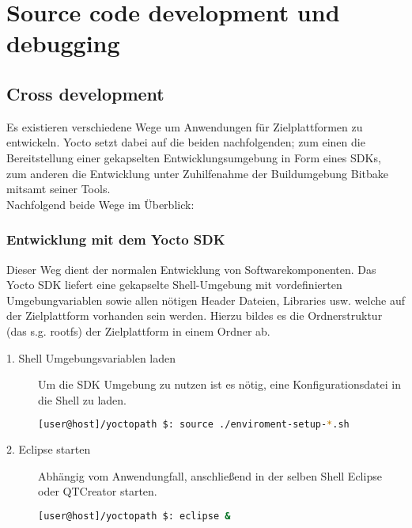 \chapter{Source code development und debugging}%
\label{cha:source_code_development}


\section{Cross development}%
\label{sec:cross_development}
Es existieren verschiedene Wege um Anwendungen für Ziel\-plattformen zu
entwickeln. Yocto setzt dabei auf die beiden nachfolgenden; zum einen die
Bereitstellung einer gekapselten Entwicklungsumgebung in Form eines \glspl{SDK},
zum anderen die Entwicklung unter Zuhilfenahme der Build\-umgebung Bitbake
mitsamt seiner Tools.  \\

Nachfolgend beide Wege im Überblick:

\subsection{Entwicklung mit dem Yocto SDK}%
\label{sub:entwicklung_mit_dem_yocto_sdk}
Dieser Weg dient der normalen Entwicklung von Software\-komponenten. Das Yocto
SDK liefert eine gekapselte Shell-Umgebung mit vordefinierten
Umgebung\-variablen sowie allen nötigen Header Dateien, Libraries usw. welche
auf der Ziel\-plattform vorhanden sein werden. Hierzu bildes es die
Ordner\-struktur (das s.g. \gls{rootfs}) der Ziel\-plattform in einem Ordner
ab. \\


\begin{description}
    \item[1. Shell Umgebungsvariablen laden] Um die SDK Umgebung zu nutzen ist
        es nötig, eine Konfigurationsdatei in die Shell zu laden.

\begin{lstlisting}[frame=single,language=bash,caption={Einrichten der SDK
        Umgebung}]
[user@host]/yoctopath $: source ./enviroment-setup-*.sh
\end{lstlisting}


    \item[2. Eclipse starten] Abhängig vom Anwendung\-fall, anschließend in der
        selben Shell Eclipse oder QTCreator starten.

\begin{lstlisting}[frame=single,language=bash,caption={Start von Eclipse in der
        zuvor konfiguierten Umgebung}]
[user@host]/yoctopath $: eclipse &
\end{lstlisting}

\end{description}



